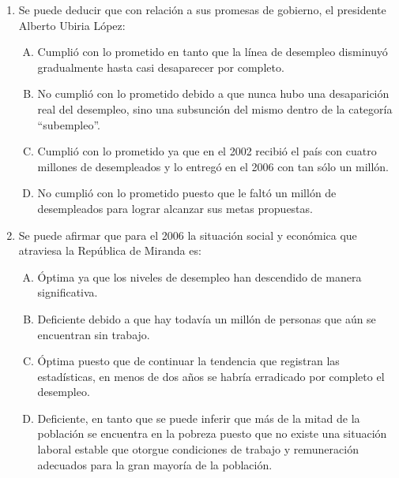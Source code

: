 \begin{enumerate}
\item Se puede deducir que con relación a sus promesas de gobierno, el presidente Alberto Ubiria López:\label{sociii-24}


\begin{enumerate}[(A) ]
\item   Cumplió con lo prometido en tanto que la línea de desempleo disminuyó gradualmente hasta casi desaparecer por completo.
 \item  No cumplió con lo prometido debido a que nunca hubo una desaparición real del desempleo, sino una subsunción del mismo dentro de la categoría ``subempleo''.
\item Cumplió con lo prometido ya que en el 2002 recibió el país con cuatro millones de desempleados y lo entregó en el 2006 con tan sólo un millón.
\item No cumplió con lo prometido puesto que le faltó un millón de desempleados para lograr alcanzar sus metas propuestas.
\end{enumerate}

\item Se puede afirmar que para el 2006 la situación social y económica que atraviesa la República de Miranda es:\label{sociii-25}


\begin{enumerate}[(A)]
\item   Óptima ya que los niveles de desempleo han descendido de manera significativa.
 \item  Deficiente debido a que hay todavía un millón de personas que aún se encuentran sin trabajo.
\item Óptima puesto que de continuar la tendencia que registran las estadísticas, en menos de dos años se habría erradicado por completo el desempleo.
\item Deficiente, en tanto que se puede inferir que más de la mitad de la población se encuentra en la pobreza puesto que no existe una situación laboral estable que otorgue condiciones de trabajo y remuneración adecuados para la gran mayoría de la población. 
\end{enumerate}


\end{enumerate}
